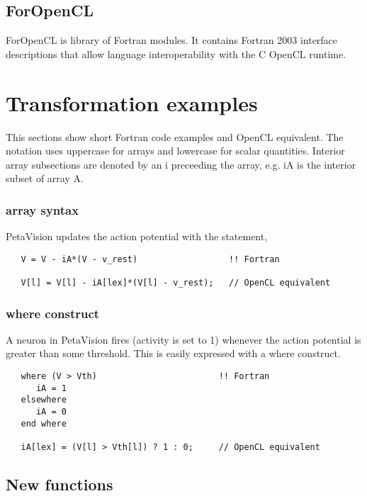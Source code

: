 \documentclass[10pt, conference, compsocconf]{IEEEtran}
\begin{document}
\subsection{ForOpenCL}

ForOpenCL is library of Fortran modules.  It contains Fortran 2003 interface
descriptions that allow language interoperability with the C OpenCL runtime.

\section{Transformation examples}

This sections show short Fortran code examples and OpenCL equivalent.
The notation uses uppercase for arrays and lowercase for scalar quantities.
Interior array subsections are denoted by an i preceeding the array, e.g. iA
is the interior subset of array A.

\subsubsection{array syntax}

PetaVision updates the action potential with the statement,

\begin{verbatim}
   V = V - iA*(V - v_rest)                  !! Fortran

   V[l] = V[l] - iA[lex]*(V[l] - v_rest);   // OpenCL equivalent
\end{verbatim}

\subsubsection{where construct}

A neuron in PetaVision fires (activity is set to 1)
whenever the action potential is greater than some threshold.
This is easily expressed with a where construct.

\begin{verbatim}
   where (V > Vth)                        !! Fortran
      iA = 1
   elsewhere
      iA = 0
   end where

   iA[lex] = (V[l] > Vth[l]) ? 1 : 0;     // OpenCL equivalent
\end{verbatim}

\subsection{New functions}
\end{document}
